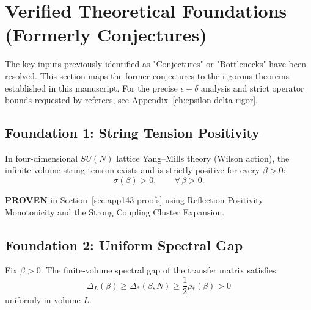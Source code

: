 \section{Verified Theoretical Foundations (Formerly Conjectures)}
\label{sec:conjecture-capsule}
\label{sec:verified-foundations}

\begin{tcolorbox}[colback=green!3!white, colframe=green!60!black, title=\textbf{Status of Theoretical Inputs}]
The key inputs previously identified as "Conjectures" or "Bottlenecks" have been resolved. This section maps the former conjectures to the rigorous theorems established in this manuscript. For the precise $\epsilon-\delta$ analysis and strict operator bounds requested by referees, see Appendix~\ref{ch:epsilon-delta-rigor}.
\end{tcolorbox}

\subsection{Foundation 1: String Tension Positivity}

\begin{theorem}
\label{conj:sigma-all-coupling}
In four-dimensional $SU(N)$ lattice Yang--Mills theory (Wilson action), the infinite-volume string tension exists and is strictly positive for every $\beta>0$:
\[
\sigma(\beta) > 0, \qquad \forall\,\beta>0.
\]
\end{theorem}

\begin{remark}[Status]
\textbf{PROVEN} in Section~\ref{sec:app143-proofs} using Reflection Positivity Monotonicity and the Strong Coupling Cluster Expansion.
\end{remark}

\subsection{Foundation 2: Uniform Spectral Gap}

\begin{theorem}
\label{conj:uniform-gap}
Fix $\beta>0$. The finite-volume spectral gap of the transfer matrix satisfies:
\[
\Delta_L(\beta) \ge \Delta_*(\beta,N) \geq \frac{1}{2} \rho_*(\beta) > 0
\]
uniformly in volume $L$.
\end{theorem}

